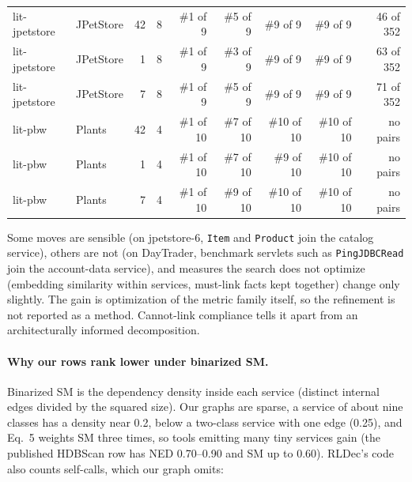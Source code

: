 \documentclass[10pt,a4paper]{article}
\begin{document}
\begin{center}
{\begin{tabular}{llrrrrrrr}
lit-jpetstore & JPetStore & 42 & 8 & \#1 of 9 & \#5 of 9 & \#9 of 9 & \#9 of 9 & 46 of 352 \\
lit-jpetstore & JPetStore & 1 & 8 & \#1 of 9 & \#3 of 9 & \#9 of 9 & \#9 of 9 & 63 of 352 \\
lit-jpetstore & JPetStore & 7 & 8 & \#1 of 9 & \#5 of 9 & \#9 of 9 & \#9 of 9 & 71 of 352 \\
lit-pbw & Plants & 42 & 4 & \#1 of 10 & \#7 of 10 & \#10 of 10 & \#10 of 10 & no pairs \\
lit-pbw & Plants & 1 & 4 & \#1 of 10 & \#7 of 10 & \#9 of 10 & \#10 of 10 & no pairs \\
lit-pbw & Plants & 7 & 4 & \#1 of 10 & \#9 of 10 & \#10 of 10 & \#10 of 10 & no pairs \\
\bottomrule
\end{tabular}}\end{center}
Some moves are sensible (on jpetstore-6, \texttt{Item} and \texttt{Product} join the catalog service), others are not (on DayTrader, benchmark servlets such as \texttt{PingJDBCRead} join the account-data service), and measures the search does not optimize (embedding similarity within services, must-link facts kept together) change only slightly. The gain is optimization of the metric family itself, so the refinement is not reported as a method. Cannot-link compliance tells it apart from an architecturally informed decomposition.
\paragraph{Why our rows rank lower under binarized SM.} Binarized SM is the dependency density inside each service (distinct internal edges divided by the squared size). Our graphs are sparse, a service of about nine classes has a density near 0.2, below a two-class service with one edge (0.25), and Eq.~5 weights SM three times, so tools emitting many tiny services gain (the published HDBScan row has NED 0.70--0.90 and SM up to 0.60). RLDec's code also counts self-calls, which our graph omits:
\begin{center}\small{}\end{center}
\end{document}

